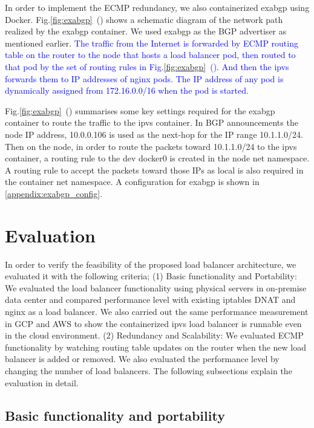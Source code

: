 In order to implement the ECMP redundancy, we also containerized exabgp using Docker.
Fig.\ref{fig:exabgp}~() shows a schematic diagram of the network path realized by the exabgp container.
We used exabgp as the BGP advertiser as mentioned earlier.
\textcolor{blue}{
The traffic from the Internet is forwarded by ECMP routing table on the router to the node that hosts a load balancer pod, then routed to that pod by the set of routing rules in Fig.\ref{fig:exabgp}~(). 
And then the ipvs forwards them to IP addresses of nginx pods.
The IP address of any pod is dynamically assigned from 172.16.0.0/16 when the pod is started. 
}

Fig.\ref{fig:exabgp}~() summarises some key settings required for the exabgp container to route the traffic to the ipvs container.
In BGP announcements the node IP address, 10.0.0.106 is used as the next-hop for the IP range 10.1.1.0/24.
Then on the node, in order to route the packets toward 10.1.1.0/24 to the ipvs container, 
a routing rule to the dev docker0 is created in the node net namespace. 
A routing rule to accept the packets toward those IPs as local is also required in the container net namespace. 
A configuration for exabgp is shown in \ref{appendix:exabgp_config}.


\section{Evaluation}\label{Evaluation}

In order to verify the feasibility of the proposed load balancer architecture, we evaluated it with the following criteria;
(1) Basic functionality and Portability:
We evaluated the load balancer functionality using physical servers in on-premise data center and compared performance level with existing iptables DNAT and nginx as a load balancer.
We also carried out the same performance measurement in GCP and AWS to show the containerized ipvs load balancer is runnable even in the cloud environment.
(2) Redundancy and Scalability:
We evaluated ECMP functionality by watching routing table updates on the router when the new load balancer is added or removed.
We also evaluated the performance level by changing the number of load balancers.
%
The following subsections explain the evaluation in detail.

\subsection{Basic functionality and portability}

